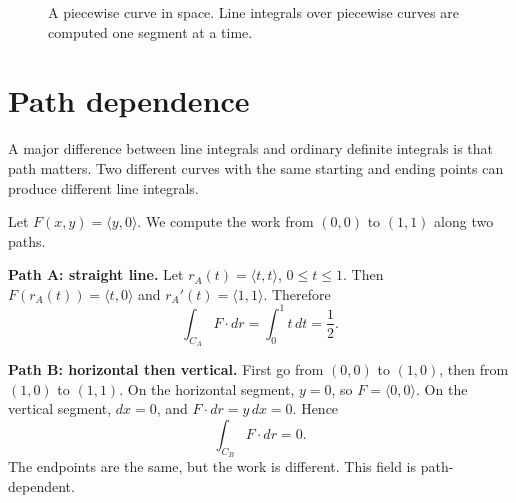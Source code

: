 \documentclass[11pt,oneside]{book}
\begin{document}
\begin{figure}[H]
\centering
{}
\caption{A piecewise curve in space. Line integrals over piecewise curves are computed one segment at a time.}
\end{figure}

\section{Path dependence}

A major difference between line integrals and ordinary definite integrals is that path matters. Two different curves with the same starting and ending points can produce different line integrals.

\begin{examplebox}
Let $F(x,y)=\langle y,0\rangle$. We compute the work from $(0,0)$ to $(1,1)$ along two paths.

\textbf{Path A: straight line.} Let $r_A(t)=\langle t,t\rangle$, $0\le t\le 1$. Then $F(r_A(t))=\langle t,0\rangle$ and $r_A'(t)=\langle 1,1\rangle$. Therefore
\[
\int_{C_A}F\cdot dr=\int_0^1 t\,dt=\frac12.
\]

\textbf{Path B: horizontal then vertical.} First go from $(0,0)$ to $(1,0)$, then from $(1,0)$ to $(1,1)$. On the horizontal segment, $y=0$, so $F=\langle 0,0\rangle$. On the vertical segment, $dx=0$, and $F\cdot dr=y\,dx=0$. Hence
\[
\int_{C_B}F\cdot dr=0.
\]
The endpoints are the same, but the work is different. This field is path-dependent.
\end{examplebox}
\end{document}
